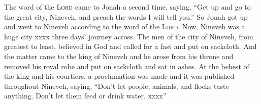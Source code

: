 
\begin{inparaenum}
     The word of the \textsc{Lord} came to Jonah a second time, saying,%
     ``Get up and go to the great city, Nineveh, and preach the words I will tell you.''%
     So Jonah got up and went to Nineveh according to the word of the \textsc{Lord}. Now, Nineveh was a huge city xxxx three days' journey across.\understood%
     The men of the city of Nineveh, from greatest to least, believed in God and called for a fast and put on sackcloth.%
     And the matter came to the king of Nineveh and he arose from his throne and removed his royal robe and put on sackcloth and sat in ashes.%
     At the behest of the king and his courtiers, a proclamation was made and it was published throughout Nineveh, saying, ``Don't let people, animals, and flocks taste anything. Don't let them feed or drink water.%
     xxxx''%
\end{inparaenum}
